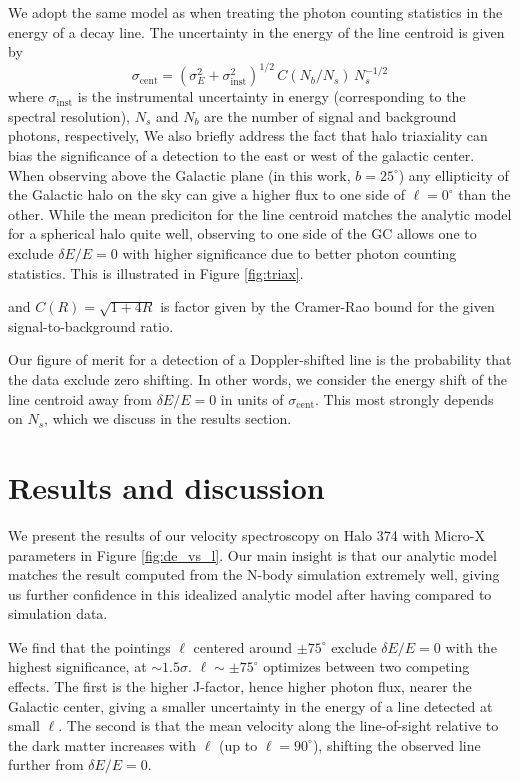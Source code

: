 \documentclass[aps,prl,10pt,twocolumn,superscriptaddress,showpacs]{revtex4-1}
\begin{document}
We adopt the same model as \cite{speckhard2016} when treating the photon counting statistics in the
energy of a decay line. The uncertainty in the energy of the line centroid is given by
\begin{equation} 
	\sigma_\mathrm{cent} = (\sigma_E^2 + \sigma_\mathrm{inst}^2)^{1/2} \, C(N_b/N_s) \, N_s^{-1/2}
\label{eq:stats}
\end{equation}
where $\sigma_\mathrm{inst}$ is the instrumental uncertainty in energy (corresponding to the spectral
resolution), $N_s$ and $N_b$ are the number of signal and background photons, respectively,
We also briefly address the fact that halo triaxiality can bias the significance of a detection to
the east or west of the galactic center. When observing above the Galactic plane (in this work,
$b=25^\circ$) any ellipticity of the Galactic halo on the sky can give a higher flux to one side of
$\ell=0^\circ$ than the other. While the mean prediciton for the line centroid matches the analytic model
for a spherical halo quite well, observing to one side of the GC allows one to exclude $\delta
E/E=0$ with higher significance due to better photon counting statistics. This is illustrated in Figure \ref{fig:triax}.

 and
 $C(R)=\sqrt{1+4R}$ is factor given by the Cramer-Rao bound \cite[e.g.]{james2006statistical} for the given signal-to-background ratio.

Our figure of merit for a detection of a Doppler-shifted line is the probability that the data
exclude zero shifting. In other words, we consider the energy shift of the line centroid
away from $\delta E/E=0$ in units of $\sigma_\mathrm{cent}$. This most strongly depends on $N_s$,
which we discuss in the results section. 

\section{Results and discussion}
\label{sec:results}

We present the results of our velocity spectroscopy on Halo 374 with Micro-X parameters in Figure \ref{fig:de_vs_l}. 
Our main insight is that our analytic model matches the result computed from the N-body simulation
extremely well, giving us further confidence in this idealized analytic model after having compared
to simulation data.

We find that the pointings $\ell$ centered around $\pm75^\circ$ exclude $\delta E/E=0$ with 
the highest significance, at $\sim 1.5\sigma$. $\ell\sim\pm75^\circ$ optimizes between two
competing effects. The first is the higher J-factor, hence higher
photon flux, nearer the Galactic center, giving a smaller uncertainty in the energy of a line
detected at small $\ell$. The second is that the mean velocity along the line-of-sight relative to
the dark matter increases with $\ell$ (up to $\ell=90^\circ$), shifting the observed line further
from $\delta E/E=0$.
\end{document}
